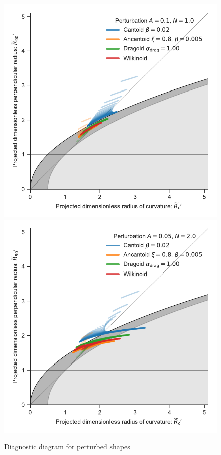 \begin{figure}
  \centering
  \includegraphics[width=\linewidth]
  {figs/wave-R90-vs-Rc-A010-N10}
  \includegraphics[width=\linewidth]
  {figs/wave-R90-vs-Rc-A005-N20}
  \caption{Diagnostic diagram for perturbed shapes}
  \label{fig:perturb-Rc-R90}
\end{figure}




